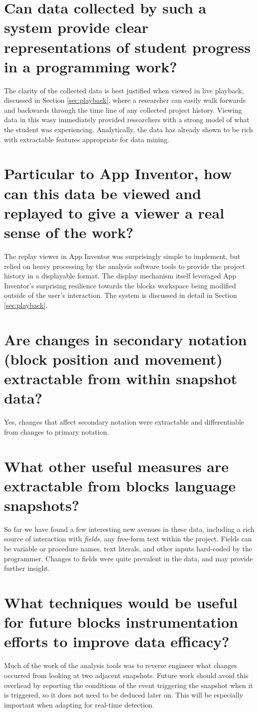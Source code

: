 \section{Can data collected by such a system provide clear representations of student progress in a programming work?}
The clarity of the collected data is best justified when viewed in live playback, discussed in Section \ref{sec:playback}, where a researcher can easily walk forwards and backwards through the time line of any collected project history. Viewing data in this wasy immediately provided researchers with a strong model of what the student was experiencing. Analytically, the data has already shown to be rich with extractable features appropriate for data mining.

\section{Particular to App Inventor, how can this data be viewed and replayed to give a viewer a real sense of the work?}
The replay viewer in App Inventor was surprisingly simple to implement, but relied on heavy processing by the analysis software tools to provide the project history in a displayable format. The display mechanism itself leveraged App Inventor's surprising resilience towards the blocks workspace being modified outside of the user's interaction. The system is discussed in detail in Section \ref{sec:playback}.

\section{Are changes in secondary notation (block position and movement) extractable from within snapshot data?}
Yes, changes that affect secondary notation were extractable and differentiable from changes to primary notation.

\section{What other useful measures are extractable from blocks language snapshots?}
So far we have found a few interesting new avenues in these data, including a rich source of interaction with \emph{fields,} any free-form text within the project. Fields can be variable or procedure names, text literals, and other inputs hard-coded by the programmer. Changes to fields were quite prevalent in the data, and may provide further insight.

\section{What techniques would be useful for future blocks instrumentation efforts to improve data efficacy?}
Much of the work of the analysis tools was to reverse engineer what changes occurred from looking at two adjacent snapshots. Future work should avoid this overhead by reporting the conditions of the event triggering the snapshot when it is triggered, so it does not need to be deduced later on. This will be especially important when adapting for real-time detection.

